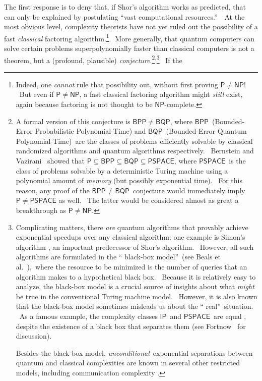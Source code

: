 \documentclass[12pt,onecolumn]{article}%
\begin{document}
The first response is to deny that, if Shor's algorithm works as predicted,
that can only be explained by postulating \textquotedblleft vast computational
resources.\textquotedblright\ \ At the most obvious level, complexity
theorists have not yet ruled out the possibility of a fast \textit{classical}
factoring algorithm.\footnote{Indeed, one \textit{cannot} rule that
possibility out, without first proving $\mathsf{P}\neq\mathsf{NP}$! \ But even
if $\mathsf{P}\neq\mathsf{NP}$, a fast classical factoring algorithm might
\textit{still} exist, again because factoring is not thought to be
$\mathsf{NP}$-complete.} \ More generally, that quantum computers can solve
certain problems superpolynomially faster than classical computers is not a
theorem, but a (profound, plausible) \textit{conjecture}.\footnote{A formal
version of this conjecture is $\mathsf{BPP}\neq\mathsf{BQP}$, where
$\mathsf{BPP}$\ (Bounded-Error Probabilistic Polynomial-Time) and
$\mathsf{BQP}$\ (Bounded-Error Quantum Polynomial-Time)\ are the classes of
problems efficiently solvable by classical randomized algorithms and quantum
algorithms respectively. \ Bernstein and Vazirani \cite{bv}\ showed that
$\mathsf{P}\subseteq\mathsf{BPP}\subseteq\mathsf{BQP}\subseteq\mathsf{PSPACE}%
$, where $\mathsf{PSPACE}$\ is the class of problems solvable by a
deterministic Turing machine using a polynomial amount of \textit{memory} (but
possibly exponential time). \ For this reason, any proof of the $\mathsf{BPP}%
\neq\mathsf{BQP}$\ conjecture would immediately imply $\mathsf{P}%
\neq\mathsf{PSPACE}$ as well. \ The latter would be considered almost as great
a breakthrough as $\mathsf{P}\neq\mathsf{NP}$.}$^{,}$\footnote{Complicating
matters, there \textit{are} quantum algorithms that provably achieve
exponential speedups over any classical algorithm: one example is Simon's
algorithm \cite{simon}, an important predecessor of Shor's algorithm.
\ However, all such algorithms are formulated in the \textquotedblleft
black-box model\textquotedblright\ (see Beals et al.\ \cite{bbcmw}),\ where
the resource to be minimized is the number of queries that an algorithm makes
to a hypothetical black box. \ Because it is relatively easy to analyze, the
black-box model is a crucial source of insights about what \textit{might} be
true in the conventional Turing machine model. \ However, it is also known
that the black-box model sometimes misleads us about the \textquotedblleft
real\textquotedblright\ situation. \ As a famous example, the complexity
classes $\mathsf{IP}$\ and $\mathsf{PSPACE}$\ are equal \cite{shamir}, despite
the existence of a black box that separates them (see Fortnow
\cite{fortnow:rel}\ for discussion).
\par
Besides the black-box model, \textit{unconditional}\ exponential separations
between quantum and classical complexities are known in several other
restricted models, including communication complexity \cite{raz:cc}.} \ If the
\end{document}
